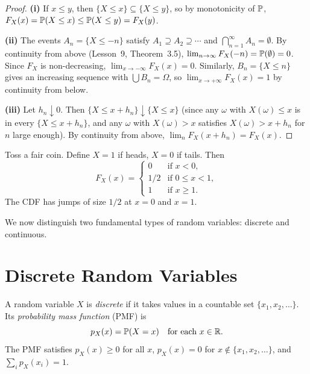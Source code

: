 \documentclass[11pt,a4paper]{article}
\begin{document}
\begin{proof}
\textbf{(i)} If $x \leq y$, then
$\{X \leq x\} \subseteq \{X \leq y\}$, so by monotonicity of $\mathbb{P}$,
$F_X(x) = \mathbb{P}(X \leq x) \leq \mathbb{P}(X \leq y) = F_X(y)$.

\textbf{(ii)} The events $A_n = \{X \leq -n\}$ satisfy
$A_1 \supseteq A_2 \supseteq \cdots$ and
$\bigcap_{n=1}^\infty A_n = \emptyset$. By continuity from above
(Lesson~9, Theorem~3.5),
$\lim_{n \to \infty} F_X(-n) = \mathbb{P}(\emptyset) = 0$.
Since $F_X$ is non-decreasing, $\lim_{x \to -\infty} F_X(x) = 0$.
Similarly, $B_n = \{X \leq n\}$ gives an increasing sequence with
$\bigcup B_n = \Omega$, so
$\lim_{x \to +\infty} F_X(x) = 1$ by continuity from below.

\textbf{(iii)} Let $h_n \downarrow 0$. Then
$\{X \leq x + h_n\} \downarrow \{X \leq x\}$ (since any $\omega$ with
$X(\omega) \leq x$ is in every $\{X \leq x + h_n\}$, and any $\omega$
with $X(\omega) > x$ satisfies $X(\omega) > x + h_n$ for $n$ large
enough). By continuity from above,
$\lim_n F_X(x + h_n) = F_X(x)$.
\end{proof}

\begin{example}
\label{ex:cdf_coin}
Toss a fair coin. Define $X = 1$ if heads, $X = 0$ if tails. Then
\[
    F_X(x) = \begin{cases}
        0 & \text{if } x < 0, \\
        1/2 & \text{if } 0 \leq x < 1, \\
        1 & \text{if } x \geq 1.
    \end{cases}
\]
The CDF has jumps of size $1/2$ at $x = 0$ and $x = 1$.
\end{example}

We now distinguish two fundamental types of random variables: discrete and
continuous.


\section{Discrete Random Variables}
\label{sec:discrete}

\begin{definition}
\label{def:discrete_rv}
A random variable $X$ is \emph{discrete} if it takes values in a
countable set $\{x_1, x_2, \ldots\}$. Its \emph{probability mass
function} (PMF) is
\[
    p_X(x) = \mathbb{P}(X = x) \quad \text{for each } x \in \mathbb{R}.
\]
The PMF satisfies $p_X(x) \geq 0$ for all $x$, $p_X(x) = 0$ for
$x \notin \{x_1, x_2, \ldots\}$, and $\sum_i p_X(x_i) = 1$.
\end{definition}
\end{document}
